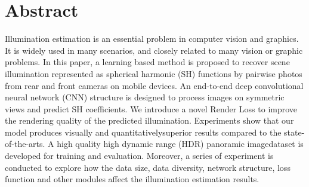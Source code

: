\chapter*{Abstract}%
Illumination estimation is an essential problem in computer vision and graphics. It is widely used in many scenarios, and closely related to many vision or graphic problems. In this paper, a learning based method is proposed to recover scene illumination represented as spherical harmonic (SH) functions by pairwise photos from rear and front cameras on mobile devices. An end-to-end deep convolutional neural network (CNN) structure is designed to process images on symmetric views and predict SH coefficients. We introduce a novel Render Loss to improve the rendering quality of the predicted illumination. Experiments show that our model produces visually and quantitativelysuperior results compared to the state-of-the-arts. A high quality high dynamic range (HDR) panoramic imagedataset is developed for training and evaluation. Moreover, a series of experiment is conducted to explore how the data size, data diversity, network structure, loss function and other modules affect the illumination  estimation results.

